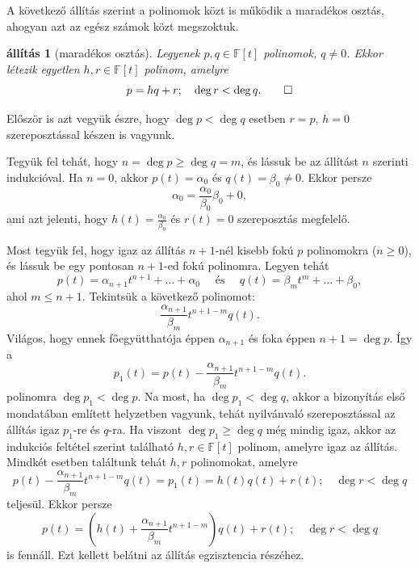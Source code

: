 \documentclass[a4paper, showtrims]{memoir}
\makeatletter
\renewenvironment{proof}[1][\proofname]
    {\par\pushQED{\qed}%
    \normalfont \topsep6\p@\@plus6\p@\relax
    \trivlist
    \item[\hskip\labelsep
        \itshape
    #1\@addpunct{:}]\ignorespaces}
    {\popQED\endtrivlist\@endpefalse}
\theoremstyle{plain}
\newtheorem{proposition}{állítás}[chapter]
\theoremstyle{remark}
\theoremstyle{definition}
\makeatother
\begin{document}
A következő állítás szerint a polinomok közt is működik a maradékos osztás,
ahogyan azt az egész számok közt megszoktuk.
\begin{proposition}[maradékos osztás]
	Legyenek $p,q\in\mathbb{F}\left[ t \right]$ polinomok, $q\neq 0$.
	Ekkor létezik egyetlen $h,r\in\mathbb{F}\left[ t \right]$ polinom, amelyre
	\[
		p
		=
		hq+r;
		\quad
		\deg r < \deg q.\qedhere
	\]
\end{proposition}
\begin{proof}
	Először is azt vegyük észre, hogy $\deg p<\deg q$ esetben $r=p$,
	$h=0$ szereposztással készen is vagyunk.

	Tegyük fel tehát, hogy $n=\deg p\geq \deg q=m$, és lássuk be az állítást $n$ szerinti indukcióval.
	Ha $n=0$, akkor $p\left( t \right)=\alpha_0$ és $q\left( t \right)=\beta_0\neq 0$.
	Ekkor persze
	\[
		\alpha_0=\frac{\alpha_0}{\beta_0}\beta_0+0,
	\]
	ami azt jelenti, hogy $h\left( t \right)=\frac{\alpha_0}{\beta_0}$ és $r\left( t \right)=0$ szereposztás
	megfelelő.

	Most tegyük fel,
	hogy igaz az állítás $n+1$-nél kisebb fokú $p$ polinomokra ($n\geq 0$),
	és lássuk be egy pontosan $n+1$-ed fokú polinomra.
	Legyen tehát
	\[
		p\left( t \right)=\alpha_{n+1}t^{n+1}+\ldots+\alpha_0
		\quad\text{ és }\quad
		q\left( t \right)=\beta_{m}t^m+\ldots+\beta_0,
	\]
	ahol $m\leq n+1$.
	Tekintsük a következő polinomot:
	\[
		\frac{\alpha_{n+1}}{\beta_m}t^{n+1-m}q\left( t \right).
	\]
	Világos, hogy ennek főegyütthatója éppen $\alpha_{n+1}$ és foka éppen $n+1=\deg p$.
	Így a
	\[
		p_1\left( t \right)
		=
		p\left( t \right)-
		\frac{\alpha_{n+1}}{\beta_m}t^{n+1-m}q\left( t \right).
	\]
	polinomra $\deg p_1<\deg p$.
	Na most, ha $\deg p_1<\deg q$, akkor a bizonyítás első mondatában említett helyzetben vagyunk,
	tehát nyilvánvaló szereposztással az állítás igaz $p_1$-re és $q$-ra.
	Ha viszont $\deg p_1\geq \deg q$ még mindig igaz, akkor az indukciós feltétel szerint található
	$h,r\in\mathbb{F}\left[ t \right]$ polinom, amelyre igaz az állítás.
	Mindkét esetben találtunk tehát $h,r$ polinomokat, amelyre
	\[
		p\left( t \right)-
		\frac{\alpha_{n+1}}{\beta_m}t^{n+1-m}q\left( t \right)
		=
		p_1\left( t \right)
		=
		h\left( t \right)q\left( t \right)+r\left( t \right);
		\quad
		\deg r < \deg q
	\]
	teljesül.
	Ekkor persze
	\[
		p\left( t \right)
		=
		\left( h\left( t \right)
		+
		\frac{\alpha_{n+1}}{\beta_m}t^{n+1-m}
		\right)
		q\left( t \right)
		+
		r\left( t \right);
		\quad
		\deg r < \deg q
	\]
	is fennáll. Ezt kellett belátni az állítás egzisztencia részéhez.


\end{proof}
\end{document}
